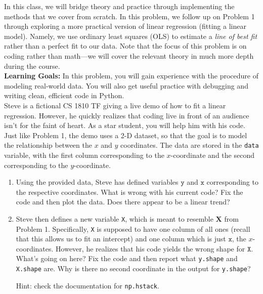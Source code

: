 \documentclass{../harvardml}
\theoremstyle{definition}
\theoremstyle{plain}
\begin{document}
\begin{problem} 
In this class, we will bridge theory and practice through implementing the methods that we cover from scratch. In this problem, we follow up on Problem 1 through exploring a more practical version of linear regression (fitting a linear model). Namely, we use ordinary least squares (OLS) to estimate a \textit{line of best fit} rather than a perfect fit to our data. Note that the focus of this problem is on coding rather than math---we will cover the relevant theory in much more depth during the course.\\

\noindent \textbf{Learning Goals:} In this problem, you will gain experience with the procedure of modeling real-world data. You will also get useful practice with debugging and writing clean, efficient code in Python. \\

\noindent Steve is a fictional CS 1810 TF giving a live demo of how to fit a linear regression. However, he quickly realizes that coding live in front of an audience isn't for the faint of heart. As a star student, you will help him with his code. Just like Problem 1, the demo uses a 2-D dataset, so that the goal is to model the relationship between the $x$ and $y$ coordinates. The data are stored in the \texttt{data} variable, with the first column corresponding to the $x$-coordinate and the second corresponding to the $y$-coordinate. 

\begin{enumerate}
    \item Using the provided data, Steve has defined variables $\texttt{y}$ and $\texttt{x}$ corresponding to the respective coordinates.  What is wrong with his current code? Fix the code and then plot the data. Does there appear to be a linear trend?

    \item Steve then defines a new variable \texttt{X}, which is meant to resemble $\bm X$ from Problem 1. Specifically, \texttt{X} is supposed to have one column of all ones (recall that this allows us to fit an intercept) and one column which is just $\texttt{x}$, the $x$-coordinates. However, he realizes that his code yields the wrong shape for $\texttt{X}$. What's going on here? Fix the code and then report what \texttt{y.shape} and \texttt{X.shape} are. Why is there no second coordinate in the output for \texttt{y.shape}?
    
    Hint: check the documentation for \texttt{np.hstack}. 


\end{enumerate}
\end{problem}
\end{document}
